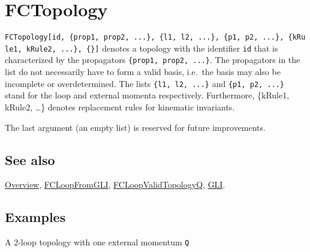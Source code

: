 \documentclass[../FeynCalcManual.tex]{subfiles}
\begin{document}
\hypertarget{fctopology}{
\section{FCTopology}\label{fctopology}}

\texttt{FCTopology[\allowbreak{}id,\ \allowbreak{}\{\allowbreak{}prop1,\ \allowbreak{}prop2,\ \allowbreak{}...\},\ \allowbreak{}\{\allowbreak{}l1,\ \allowbreak{}l2,\ \allowbreak{}...\},\ \allowbreak{}\{\allowbreak{}p1,\ \allowbreak{}p2,\ \allowbreak{}...\},\ \allowbreak{}\{\allowbreak{}kRule1,\ \allowbreak{}kRule2,\ \allowbreak{}...\},\ \allowbreak{}\{\allowbreak{}\}]}
denotes a topology with the identifier \texttt{id} that is characterized
by the propagators
\texttt{\{\allowbreak{}prop1,\ \allowbreak{}prop2,\ \allowbreak{}...\}}.
The propagators in the list do not necessarily have to form a valid
basis, i.e.~the basis may also be incomplete or overdetermined. The
lists \texttt{\{\allowbreak{}l1,\ \allowbreak{}l2,\ \allowbreak{}...\}}
and \texttt{\{\allowbreak{}p1,\ \allowbreak{}p2,\ \allowbreak{}...\}}
stand for the loop and external momenta respectively. Furthermore,
\{kRule1, kRule2, \ldots\} denotes replacement rules for kinematic
invariants.

The last argument (an empty list) is reserved for future improvements.

\subsection{See also}

\hyperlink{toc}{Overview}, \hyperlink{fcloopfromgli}{FCLoopFromGLI},
\hyperlink{fcloopvalidtopologyq}{FCLoopValidTopologyQ},
\hyperlink{gli}{GLI}.

\subsection{Examples}

A 2-loop topology with one external momentum \texttt{Q}

\begin{Shaded}
\begin{Highlighting}[]
\OperatorTok{[}\OperatorTok{,} \OperatorTok{\{}\OperatorTok{[}\OperatorTok{],}\OperatorTok{[}\OperatorTok{],}\OperatorTok{[} \SpecialCharTok{{-}}\SpecialCharTok{{-}}\OperatorTok{],}\OperatorTok{[} \SpecialCharTok{{-}}\OperatorTok{],}\OperatorTok{[} \SpecialCharTok{{-}}\OperatorTok{]\},} \OperatorTok{\{}\OperatorTok{,}\OperatorTok{\},} \OperatorTok{\{}\OperatorTok{\},} \OperatorTok{\{}
   \OperatorTok{[}\OperatorTok{[}\OperatorTok{]]} \OtherTok{{-}\textgreater{}}\OperatorTok{\},} \OperatorTok{\{\}]}
\end{Highlighting}
\end{Shaded}
\end{document}
